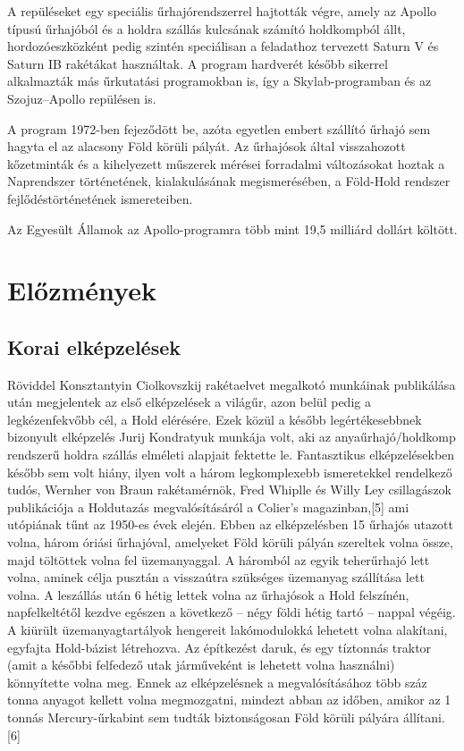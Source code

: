 \documentclass[12pt]{article}
\begin{document}
A repüléseket egy speciális űrhajórendszerrel hajtották végre, amely az Apollo típusú űrhajóból és a holdra szállás kulcsának számító holdkompból állt, hordozóeszközként pedig szintén speciálisan a feladathoz tervezett Saturn V és Saturn IB rakétákat használtak. A program hardverét később sikerrel alkalmazták más űrkutatási programokban is, így a Skylab-programban és az Szojuz–Apollo repülésen is.

A program 1972-ben fejeződött be, azóta egyetlen embert szállító űrhajó sem hagyta el az alacsony Föld körüli pályát. Az űrhajósok által visszahozott kőzetminták és a kihelyezett műszerek mérései forradalmi változásokat hoztak a Naprendszer történetének, kialakulásának megismerésében, a Föld-Hold rendszer fejlődéstörténetének ismereteiben.

Az Egyesült Államok az Apollo-programra több mint 19,5 milliárd dollárt költött.

\section{Előzmények}

\subsection{Korai elképzelések}

Röviddel Konsztantyin Ciolkovszkij rakétaelvet megalkotó munkáinak publikálása után megjelentek az első elképzelések a világűr, azon belül pedig a legkézenfekvőbb cél, a Hold elérésére. Ezek közül a később legértékesebbnek bizonyult elképzelés Jurij Kondratyuk munkája volt, aki az anyaűrhajó/holdkomp rendszerű holdra szállás elméleti alapjait fektette le. Fantasztikus elképzelésekben később sem volt hiány, ilyen volt a három legkomplexebb ismeretekkel rendelkező tudós, Wernher von Braun rakétamérnök, Fred Whiplle és Willy Ley csillagászok publikációja a Holdutazás megvalósításáról a Colier's magazinban,[5] ami utópiának tűnt az 1950-es évek elején. Ebben az elképzelésben 15 űrhajós utazott volna, három óriási űrhajóval, amelyeket Föld körüli pályán szereltek volna össze, majd töltöttek volna fel üzemanyaggal. A háromból az egyik teherűrhajó lett volna, aminek célja pusztán a visszaútra szükséges üzemanyag szállítása lett volna. A leszállás után 6 hétig lettek volna az űrhajósok a Hold felszínén, napfelkeltétől kezdve egészen a következő – négy földi hétig tartó – nappal végéig. A kiürült üzemanyagtartályok hengereit lakómodulokká lehetett volna alakítani, egyfajta Hold-bázist létrehozva. Az építkezést daruk, és egy tíztonnás traktor (amit a későbbi felfedező utak járműveként is lehetett volna használni) könnyítette volna meg. Ennek az elképzelésnek a megvalósításához több száz tonna anyagot kellett volna megmozgatni, mindezt abban az időben, amikor az 1 tonnás Mercury-űrkabint sem tudták biztonságosan Föld körüli pályára állítani.[6]
\end{document}
